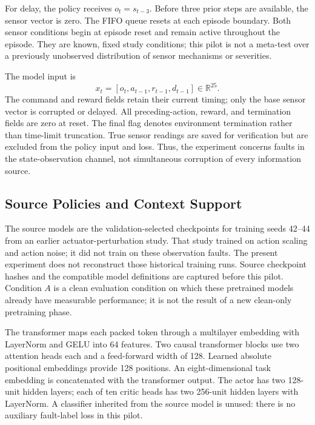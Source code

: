 \documentclass[runningheads]{llncs}
\begin{document}
For delay, the policy receives $o_t=s_{t-3}$. Before three prior steps are available, the sensor vector is zero. The FIFO queue resets at each episode boundary. Both sensor conditions begin at episode reset and remain active throughout the episode. They are known, fixed study conditions; this pilot is not a meta-test over a previously unobserved distribution of sensor mechanisms or severities.

The model input is
\begin{equation}
 x_t=[o_t,a_{t-1},r_{t-1},d_{t-1}]\in\mathbb{R}^{25}.
 \label{eq:input}
\end{equation}
The command and reward fields retain their current timing; only the base sensor vector is corrupted or delayed. All preceding-action, reward, and termination fields are zero at reset. The final flag denotes environment termination rather than time-limit truncation. True sensor readings are saved for verification but are excluded from the policy input and loss. Thus, the experiment concerns faults in the state-observation channel, not simultaneous corruption of every information source.

\subsection{Source Policies and Context Support}
The source models are the validation-selected checkpoints for training seeds 42--44 from an earlier actuator-perturbation study. That study trained on action scaling and action noise; it did not train on these observation faults. The present experiment does not reconstruct those historical training runs. Source checkpoint hashes and the compatible model definitions are captured before this pilot. Condition $A$ is a clean evaluation condition on which these pretrained models already have measurable performance; it is not the result of a new clean-only pretraining phase.

The transformer maps each packed token through a multilayer embedding with LayerNorm and GELU into 64 features. Two causal transformer blocks use two attention heads each and a feed-forward width of 128. Learned absolute positional embeddings provide 128 positions. An eight-dimensional task embedding is concatenated with the transformer output. The actor has two 128-unit hidden layers; each of ten critic heads has two 256-unit hidden layers with LayerNorm. A classifier inherited from the source model is unused: there is no auxiliary fault-label loss in this pilot.
\end{document}
